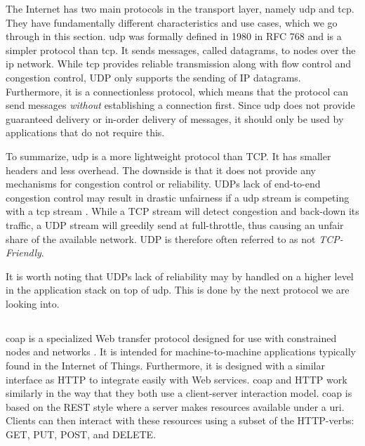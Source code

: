 The Internet has two main protocols in the transport layer, namely \gls{udp} and
\gls{tcp}. They have fundamentally different characteristics and use cases,
which we go through in this section. \gls{udp} was formally defined in 1980 in
RFC 768\cite{rfc-udp} and is a simpler protocol than \gls{tcp}. It sends
messages, called datagrams, to nodes over the \gls{ip} network. While \gls{tcp}
provides reliable transmission along with flow control and congestion control,
UDP only supports the sending of IP datagrams. Furthermore, it is a
connectionless protocol, which means that the protocol can send messages
\textit{without} establishing a connection first. Since \gls{udp} does not
provide guaranteed delivery or in-order delivery of messages, it should only be
used by applications that do not require this.

To summarize, \gls{udp} is a more lightweight protocol than TCP. It has smaller
headers and less overhead. The downside is that it does not provide any
mechanisms for congestion control or reliability. UDPs lack of end-to-end
congestion control may result in drastic unfairness if a \gls{udp} stream is
competing with a \gls{tcp} stream \cite{floyd-congestion}. While a TCP stream
will detect congestion and back-down its traffic, a UDP stream will greedily
send at full-throttle, thus causing an unfair share of the available network.
UDP is therefore often referred to as not \textit{TCP-Friendly}.

 It is worth noting that UDPs lack of reliability may by handled on a higher
 level in the application stack on top of \gls{udp}. This is done by the next
 protocol we are looking into.

\subsection{}

\gls{coap} is a specialized Web transfer protocol designed for use with
constrained nodes and  networks \cite{rfc-7252}. It is intended for
machine-to-machine applications typically found in the Internet of Things.
Furthermore, it is designed with a similar interface as HTTP to integrate easily
with Web services. \gls{coap} and HTTP work similarly in the way that they both
use a client-server interaction model. \Gls{coap} is based on the REST style
where a server makes resources available under a \gls{uri}. Clients can then
interact with these resources using a subset of the HTTP-verbs: GET, PUT, POST,
and DELETE.

